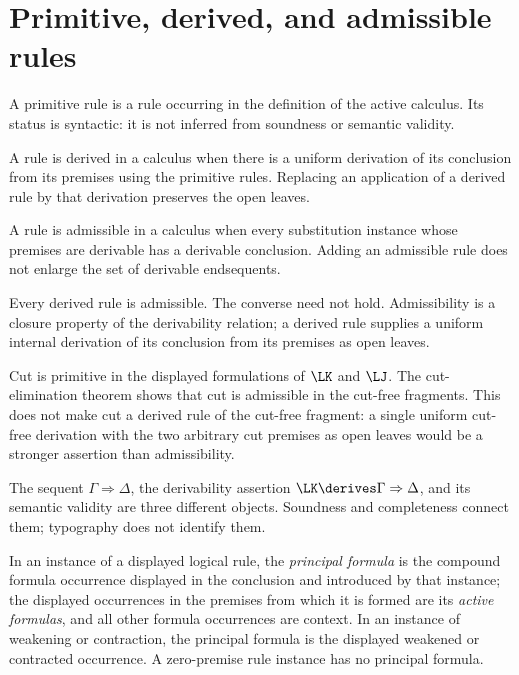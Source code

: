 \section{Primitive, derived, and admissible rules}
\label{sec:lk-lj-05}

\begin{definition}
A primitive rule is a rule occurring in the definition of the active calculus.
Its status is syntactic: it is not inferred from soundness or semantic
validity.
\end{definition}

\begin{definition}
A rule is derived in a calculus when there is a uniform derivation of its
conclusion from its premises using the primitive rules.  Replacing an
application of a derived rule by that derivation preserves the open leaves.
\end{definition}

\begin{definition}
A rule is admissible in a calculus when every substitution instance whose
premises are derivable has a derivable conclusion.  Adding an admissible rule
does not enlarge the set of derivable endsequents.
\end{definition}

Every derived rule is admissible.  The converse need not hold.  Admissibility
is a closure property of the derivability relation; a derived rule supplies
a uniform internal derivation of its conclusion from its premises as open
leaves.

\begin{example}
Cut is primitive in the displayed formulations of \(\LK\) and \(\LJ\).  The
cut-elimination theorem shows that cut is admissible in the cut-free fragments.
This does not make cut a derived rule of the cut-free fragment: a single
uniform cut-free derivation with the two arbitrary cut premises as open leaves
would be a stronger assertion than admissibility.
\end{example}

\begin{warning}
The sequent \(\Gamma\Rightarrow\Delta\), the derivability assertion
\(\LK\derives\Gamma\Rightarrow\Delta\), and its semantic validity are three
different objects.  Soundness and completeness connect them; typography does
not identify them.
\end{warning}

\begin{definition}
In an instance of a displayed logical rule, the \emph{principal formula} is
the compound formula occurrence displayed in the conclusion and introduced
by that instance; the displayed occurrences in the premises from which it
is formed are its \emph{active formulas}, and all other formula occurrences
are context.  In an instance of weakening or contraction, the principal
formula is the displayed weakened or contracted occurrence.  A zero-premise
rule instance has no principal formula.
\end{definition}

